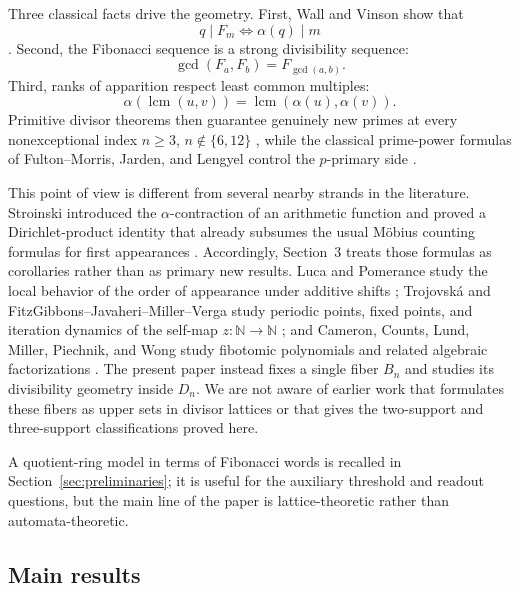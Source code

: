 \documentclass[11pt,letterpaper]{article}
\numberwithin{equation}{section}
\theoremstyle{plain}
\theoremstyle{definition}
\theoremstyle{remark}
\newcommand{\NN}{\mathbb{N}}
\DeclareMathOperator{\lcmop}{lcm}
\begin{document}
Three classical facts drive the geometry. First, Wall and Vinson show that
\[
q\mid F_m\iff \alpha(q)\mid m
\]
\cite{Wall1960FibonacciModm,Vinson1963RankApparition}. Second, the Fibonacci
sequence is a strong divisibility sequence:
\[
\gcd(F_a,F_b)=F_{\gcd(a,b)}.
\]
Third, ranks of apparition respect least common multiples:
\[
\alpha(\lcmop(u,v))=\lcmop(\alpha(u),\alpha(v)).
\]
Primitive divisor theorems then guarantee genuinely new primes at every
nonexceptional index $n\ge 3$, $n\notin\{6,12\}$
\cite{Yabuta2001PrimitiveDivisorFibonacci,BiluHanrotVoutier2001PrimitiveDivisorsLucas},
while the classical prime-power formulas of Fulton--Morris, Jarden, and
Lengyel control the $p$-primary side
\cite{FultonMorris1969ArithmeticalFunctions,Jarden1966RecurringSequences,Lengyel1995OrderFibonacciLucas}.

This point of view is different from several nearby strands in the literature.
Stroinski introduced the $\alpha$-contraction of an arithmetic function and
proved a Dirichlet-product identity that already subsumes the usual M\"obius
counting formulas for first appearances \cite{Stroinski2016AlphaContraction}.
Accordingly, Section~3 treats those formulas as corollaries rather than as
primary new results. Luca and Pomerance study the local behavior of the order
of appearance under additive shifts \cite{LucaPomerance2014LocalBehavior};
Trojovsk\'a and FitzGibbons--Javaheri--Miller--Verga study periodic points,
fixed points, and iteration dynamics of the self-map $z:\NN\to\NN$
\cite{Trojovska2020PeriodicPoints,FitzGibbonsJavaheriMillerVerga2025Dynamics};
and Cameron, Counts, Lund, Miller, Piechnik, and Wong study fibotomic
polynomials and related algebraic factorizations
\cite{CameronCountsLundMillerPiechnikWong2022Fibotomic}. The present paper
instead fixes a single fiber $B_n$ and studies its divisibility geometry inside
$D_n$. We are not aware of earlier work that formulates these fibers as upper
sets in divisor lattices or that gives the two-support and three-support
classifications proved here.

A quotient-ring model in terms of Fibonacci words is recalled in
Section~\ref{sec:preliminaries}; it is useful for the auxiliary threshold and
readout questions, but the main line of the paper is lattice-theoretic rather
than automata-theoretic.

\subsection*{Main results}
\end{document}
